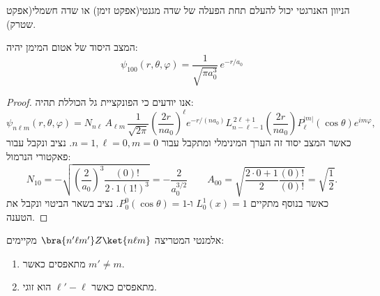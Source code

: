 \documentclass{tstextbook}
\begin{document}
\begin{remark}
הניוון האנרגטי יכול להעלם תחת הפעלה של שדה מגנטי(אפקט זימן) או שדה חשמלי(אפקט שטרק).

\end{remark}
\begin{proposition}
המצב היסוד של אטום המימן יהיה:
$$\psi_{100}(r,\theta,\varphi)=\frac{1}{\sqrt{\pi a_{0}^{3}}}\,e^{-r/a_{0}}$$

\end{proposition}
\begin{proof}
אנו יודעים כי הפונקציית גל הכוללת תהיה:
$$\psi_{n\ell m}(r,\theta,\varphi)=N_{n\ell}\,A_{\ell m}\,\frac{1}{\sqrt{2\pi}}\left(\frac{2r}{n a_{0}}\right)^{\ell}e^{-r/(n a_{0})}L_{n-\ell-1}^{\,2\ell+1}\left(\frac{2r}{n a_{0}}\right)P_{\ell}^{|m|}(\cos\theta)e^{i m\varphi},$$
כאשר המצב יסוד זה הערך המינימלי ומתקבל עבור \(n=1,\ell=0,m=0\). נציב ונקבל עבור פאקטורי הנרמול:
$$N_{10}=-\sqrt{\left(\frac{2}{a_{0}}\right)^{3}\frac{(0)!}{2\cdot1\left(1!\right)^{3}}}=-\frac{2}{a_{0}^{3/2}}\qquad A_{00}=\sqrt{\frac{2\cdot0+1}{2}\frac{(0)!}{(0)!}}=\sqrt{\frac{1}{2}}.$$
כאשר בנוסף מתקיים \(L^{1}_{0}(x)=1\) ו-\(P_{0}^{0}\left( \cos \theta \right)=1\). נציב בשאר הביטוי ונקבל את הטענה.

\end{proof}
\begin{lemma}
אלמנטי המטריצה \(\bra{n'\ell m'}Z\ket{n\ell m}\) מקיימים:

  \begin{enumerate}
    \item מתאפסים כאשר \(m'\neq m\). 


    \item מתאפסים כאשר \(\ell'-\ell\) הוא זוגי. 


  \end{enumerate}
\end{lemma}
\end{document}
